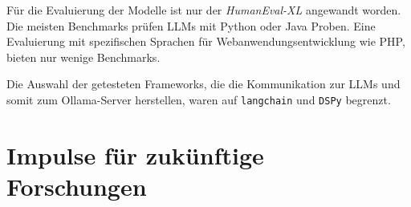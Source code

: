Für die Evaluierung der Modelle ist nur der \textit{HumanEval-XL} angewandt worden. Die meisten Benchmarks prüfen LLMs mit Python oder Java Proben. Eine Evaluierung mit spezifischen Sprachen für Webanwendungsentwicklung wie PHP, bieten nur wenige Benchmarks.\vspace{0.2cm}

Die Auswahl der getesteten Frameworks, die die Kommunikation zur LLMs und somit zum Ollama-Server herstellen, waren auf \texttt{langchain} und \texttt{DSPy} begrenzt.\vspace{0.2cm}

\section{Impulse für zukünftige Forschungen}

